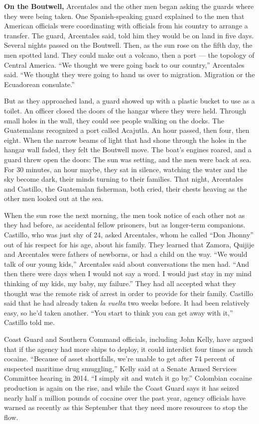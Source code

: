 \textbf{On the Boutwell,} Arcentales and the other men began asking the
guards where they were being taken. One Spanish-speaking guard explained
to the men that American officials were coordinating with officials from
his country to arrange a transfer. The guard, Arcentales said, told him
they would be on land in five days. Several nights passed on the
Boutwell. Then, as the sun rose on the fifth day, the men spotted land.
They could make out a volcano, then a port --- the topology of Central
America. ``We thought we were going back to our country,'' Arcentales
said. ``We thought they were going to hand us over to migration.
Migration or the Ecuadorean consulate.''

But as they approached land, a guard showed up with a plastic bucket to
use as a toilet. An officer closed the doors of the hangar where they
were held. Through small holes in the wall, they could see people
walking on the docks. The Guatemalans recognized a port called Acajutla.
An hour passed, then four, then eight. When the narrow beams of light
that had shone through the holes in the hangar wall faded, they felt the
Boutwell move. The boat's engines roared, and a guard threw open the
doors: The sun was setting, and the men were back at sea. For 30
minutes, an hour maybe, they sat in silence, watching the water and the
sky become dark, their minds turning to their families. That night,
Arcentales and Castillo, the Guatemalan fisherman, both cried, their
chests heaving as the other men looked out at the sea.

When the sun rose the next morning, the men took notice of each other
not as they had before, as accidental fellow prisoners, but as
longer-term companions. Castillo, who was just shy of 24, asked
Arcentales, whom he called ``Don Jhonny'' out of his respect for his
age, about his family. They learned that Zamora, Quijije and Arcentales
were fathers of newborns, or had a child on the way. ``We would talk of
our young kids,'' Arcentales said about conversations the men had. ``And
then there were days when I would not say a word. I would just stay in
my mind thinking of my kids, my baby, my failure.'' They had all
accepted what they thought was the remote risk of arrest in order to
provide for their family. Castillo said that he had already taken
\emph{la vuelta} two weeks before. It had been relatively easy, so he'd
taken another. ``You start to think you can get away with it,'' Castillo
told me.

Coast Guard and Southern Command officials, including John Kelly, have
argued that if the agency had more ships to deploy, it could interdict
four times as much cocaine. ``Because of asset shortfalls, we're unable
to get after 74 percent of suspected maritime drug smuggling,'' Kelly
said at a Senate Armed Services Committee hearing in 2014. ``I simply
sit and watch it go by.'' Colombian cocaine production is again on the
rise, and while the Coast Guard says it has seized nearly half a million
pounds of cocaine over the past year, agency officials have warned as
recently as this September that they need more resources to stop the
flow.


